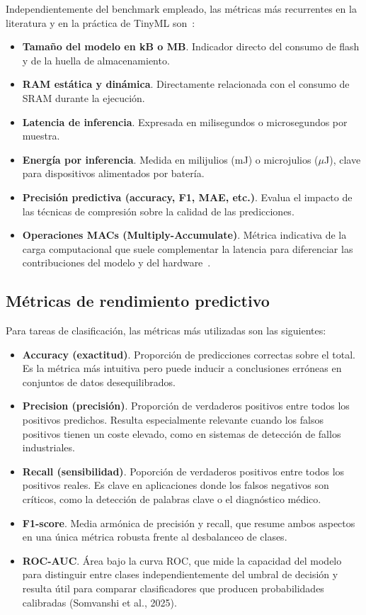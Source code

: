 \documentclass[a4paper,12pt,twoside,final]{book}
\begin{document}
Independientemente del benchmark empleado, las métricas más recurrentes en la literatura y en la práctica de TinyML
son~\cite{lin2023ieeemcas,somvanshi2025acm,chinnaraju2025wjarr}:
\begin{itemize}
  \item \textbf{Tamaño del modelo en kB o MB}. Indicador directo del consumo de flash y de la huella de almacenamiento.
  \item \textbf{RAM estática y dinámica}. Directamente relacionada con el consumo de SRAM durante la ejecución.
  \item \textbf{Latencia de inferencia}. Expresada en milisegundos o microsegundos por muestra.
  \item \textbf{Energía por inferencia}. Medida en milijulios (mJ) o microjulios ($\mu$J), clave para dispositivos alimentados
  por batería.
  \item \textbf{Precisión predictiva (accuracy, F1, MAE, etc.)}. Evalua el impacto de las técnicas de compresión
  sobre la calidad de las predicciones.
  \item \textbf{Operaciones MACs (Multiply-Accumulate)}. Métrica indicativa de la carga computacional que suele
  complementar la latencia para diferenciar las contribuciones del modelo y del hardware~\cite{somvanshi2025acm}.
\end{itemize}

\subsection{Métricas de rendimiento predictivo}
Para tareas de clasificación, las métricas más utilizadas son las siguientes:
\begin{itemize}
  \item \textbf{Accuracy (exactitud)}. Proporción de predicciones correctas sobre el total. Es la métrica más intuitiva
  pero puede inducir a conclusiones erróneas en conjuntos de datos desequilibrados.
  \item \textbf{Precision (precisión)}. Proporción de verdaderos positivos entre todos los positivos predichos. Resulta
  especialmente relevante cuando los falsos positivos tienen un coste elevado, como en sistemas de detección de
  fallos industriales.
  \item \textbf{Recall (sensibilidad)}. Poporción de verdaderos positivos entre todos los positivos reales. Es clave
  en aplicaciones donde los falsos negativos son críticos, como la detección de palabras clave o el diagnóstico médico.
  \item \textbf{F1-score}. Media armónica de precisión y recall, que resume ambos aspectos en una única métrica robusta
  frente al desbalanceo de clases.
  \item \textbf{ROC-AUC}. Área bajo la curva ROC, que mide la capacidad del modelo para distinguir entre clases
  independientemente del umbral de decisión y resulta útil para comparar clasificadores que producen probabilidades
  calibradas (Somvanshi et al., 2025).
\end{itemize}
\end{document}
